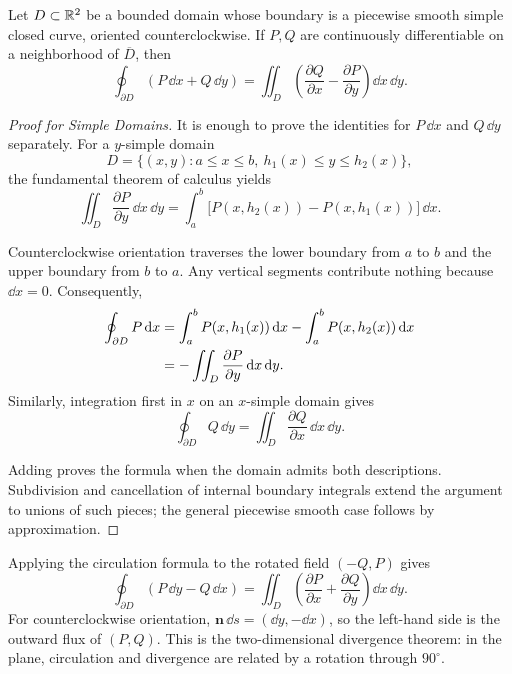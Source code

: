 \begin{theorem}
\label{thm:green-plane}
Let $D\subset\mathbb{R}^2$ be a bounded domain whose boundary is a piecewise smooth simple closed curve, oriented counterclockwise. If $P,Q$ are continuously differentiable on a neighborhood of $\overline D$, then
\begin{equation}
\oint_{\partial D}(P\,\dd x+Q\,\dd y)
=\iint_D\left(\frac{\partial Q}{\partial x}-\frac{\partial P}{\partial y}\right)\dd x\,\dd y.
\end{equation}

\end{theorem}

\begin{proof}[Proof for Simple Domains]
It is enough to prove the identities for $P\,\dd x$ and $Q\,\dd y$ separately. For a $y$-simple domain
\[
D=\{(x,y):a\leq x\leq b,\ h_1(x)\leq y\leq h_2(x)\},
\]
the fundamental theorem of calculus yields
\begin{equation}
\iint_D\frac{\partial P}{\partial y}\,\dd x\,\dd y
=\int_a^b\big[P(x,h_2(x))-P(x,h_1(x))\big]\,\dd x.
\end{equation}

Counterclockwise orientation traverses the lower boundary from $a$ to $b$ and the upper boundary from $b$ to $a$. Any vertical segments contribute nothing because $\dd x=0$. Consequently,
\begin{align}
\oint_{\partial D}P\,\mathrm{d} x
&=\int_a^b P(x,h_1(x))\,\mathrm{d} x-\int_a^b P(x,h_2(x))\,\mathrm{d} x\notag\\
&=-\iint_D\frac{\partial P}{\partial y}\,\mathrm{d} x\,\mathrm{d} y.
\end{align}
Similarly, integration first in $x$ on an $x$-simple domain gives
\[
\oint_{\partial D}Q\,\dd y=\iint_D\frac{\partial Q}{\partial x}\,\dd x\,\dd y.
\]

Adding proves the formula when the domain admits both descriptions. Subdivision and cancellation of internal boundary integrals extend the argument to unions of such pieces; the general piecewise smooth case follows by approximation.
\end{proof}

\begin{remark}
Applying the circulation formula to the rotated field $(-Q,P)$ gives
\begin{equation}
\oint_{\partial D}(P\,\dd y-Q\,\dd x)
=\iint_D\left(\frac{\partial P}{\partial x}+\frac{\partial Q}{\partial y}\right)\dd x\,\dd y.
\end{equation}
For counterclockwise orientation, $\mathbf{n}\,\dd s=(\dd y,-\dd x)$, so the left-hand side is the outward flux of $(P,Q)$. This is the two-dimensional divergence theorem: in the plane, circulation and divergence are related by a rotation through $90^\circ$.
\end{remark}

